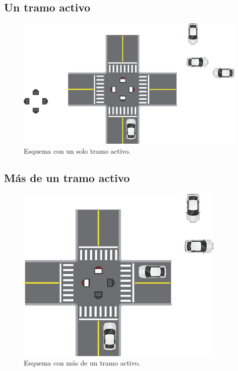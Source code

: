 \subsection{Un tramo activo}
\begin{figure}[htbp]
	\centering
	\includegraphics[width=1.2\textwidth]{diagramas/un-activo.eps}
	\caption{Esquema con un solo tramo activo.}
\end{figure}

\subsection{Más de un tramo activo}
\begin{figure}[htbp]
	\centering
	\includegraphics[width=0.9\textwidth]{diagramas/dos-activos.eps}
	\caption{Esquema con más de un tramo activo.}
\end{figure}

